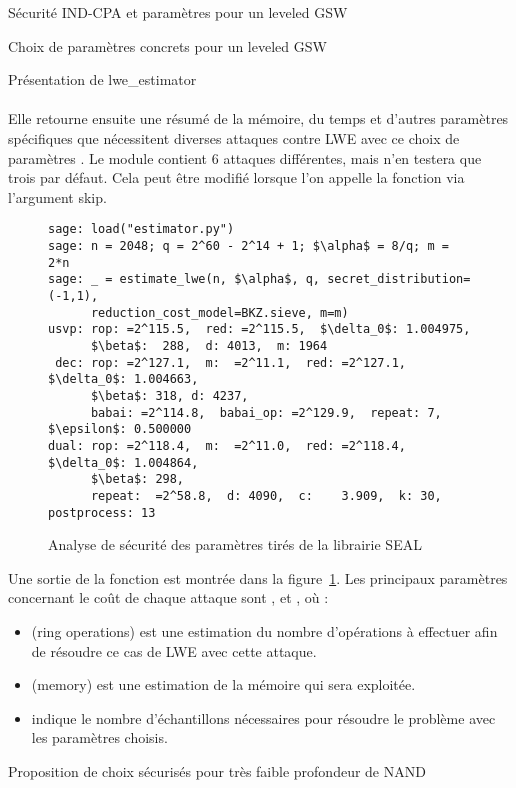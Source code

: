 \begin{section}{Sécurité IND-CPA et paramètres pour un leveled GSW}
\begin{subsection}{Choix de paramètres concrets pour un leveled GSW}
\begin{subsubsection}{Présentation de lwe\_estimator}
\paragraph{}
Elle retourne ensuite une résumé de la mémoire, du temps et d'autres paramètres spécifiques que nécessitent
diverses attaques contre LWE avec ce choix de paramètres . Le module contient 6 attaques différentes, mais n'en testera que
trois par défaut. Cela peut être modifié lorsque l'on appelle la fonction  via l'argument skip.
\flushleft
\begin{figure}
\begin{lstlisting}[mathescape=true]
sage: load("estimator.py")
sage: n = 2048; q = 2^60 - 2^14 + 1; $\alpha$ = 8/q; m = 2*n
sage: _ = estimate_lwe(n, $\alpha$, q, secret_distribution=(-1,1), 
	  reduction_cost_model=BKZ.sieve, m=m)
usvp: rop: =2^115.5,  red: =2^115.5,  $\delta_0$: 1.004975,  
      $\beta$:  288,  d: 4013,  m: 1964
 dec: rop: =2^127.1,  m:  =2^11.1,  red: =2^127.1,  $\delta_0$: 1.004663,  
      $\beta$: 318, d: 4237,  
      babai: =2^114.8,  babai_op: =2^129.9,  repeat: 7,  $\epsilon$: 0.500000
dual: rop: =2^118.4,  m:  =2^11.0,  red: =2^118.4,  $\delta_0$: 1.004864,  
      $\beta$: 298,  
      repeat:  =2^58.8,  d: 4090,  c:    3.909,  k: 30, postprocess: 13
\end{lstlisting}
\caption{Analyse de sécurité des paramètres tirés de la librairie SEAL}
\label{fig:seal_estimate}
\end{figure}


\vspace{0.2cm}
Une sortie de la fonction  est montrée dans la figure~\ref{fig:seal_estimate}.
Les principaux paramètres concernant le coût de chaque attaque sont ,  et , où :

\begin{itemize}
\item {} (ring operations) est une estimation du nombre d'opérations à effectuer afin de résoudre ce cas de LWE avec cette attaque.
\item  {} (memory) est une estimation de la mémoire qui sera exploitée.
\item {} indique le nombre d'échantillons nécessaires pour résoudre le problème avec les paramètres choisis.
\end{itemize}

\end{subsubsection}
\begin{subsubsection}{Proposition de choix sécurisés pour très faible profondeur de NAND} \label{sec:choix_concrets}

\end{subsubsection}
\end{subsection}
\end{section}
